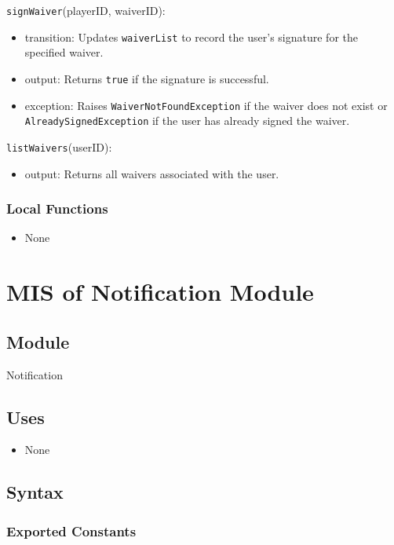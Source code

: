 \documentclass[12pt, titlepage]{article}
\begin{document}
\noindent \texttt{signWaiver}(playerID, waiverID):  
\begin{itemize}
    \item transition: Updates \texttt{waiverList} to record the user's signature for the specified waiver.
    \item output: Returns \texttt{true} if the signature is successful.
    \item exception: Raises \texttt{WaiverNotFoundException} if the waiver does not exist or \texttt{AlreadySignedException} if the user has already signed the waiver.
\end{itemize}

\noindent \texttt{listWaivers}(userID):  
\begin{itemize}
    \item output: Returns all waivers associated with the user.
\end{itemize}

\subsubsection{Local Functions}
\begin{itemize}
    \item None
\end{itemize}

\section{MIS of Notification Module} \label{Module:Notification}

\subsection{Module}

Notification

\subsection{Uses}

\begin{itemize}
    \item None
\end{itemize}

\subsection{Syntax}

\subsubsection{Exported Constants}
\end{document}
